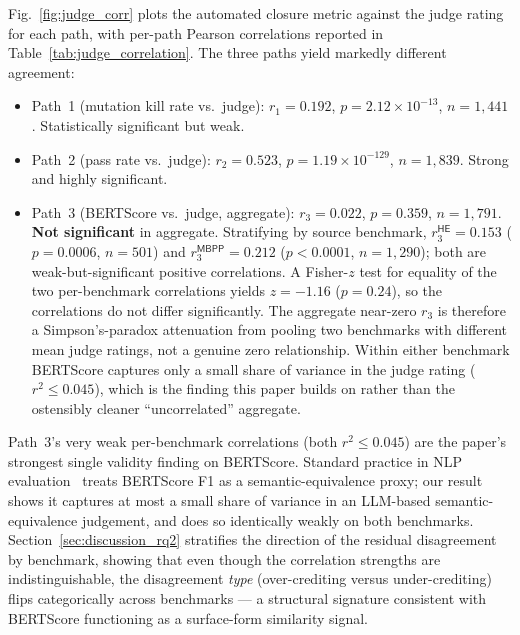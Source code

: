 \medskip



Fig.~\ref{fig:judge_corr} plots the automated closure metric against the judge rating for each path, with per-path Pearson correlations reported in Table~\ref{tab:judge_correlation}. The three paths yield markedly different agreement:

\begin{itemize}
  \item Path~1 (mutation kill rate vs.\ judge): $r_1 = 0.192$, $p = 2.12 \times 10^{-13}$, $n = 1{,}441$. Statistically significant but weak.
  \item Path~2 (pass rate vs.\ judge): $r_2 = 0.523$, $p = 1.19 \times 10^{-129}$, $n = 1{,}839$. Strong and highly significant.
  \item Path~3 (BERTScore vs.\ judge, aggregate): $r_3 = 0.022$, $p = 0.359$, $n = 1{,}791$. \textbf{Not significant} in aggregate. Stratifying by source benchmark, $r_3^{\textsf{HE}} = 0.153$ ($p = 0.0006$, $n = 501$) and $r_3^{\textsf{MBPP}} = 0.212$ ($p < 0.0001$, $n = 1{,}290$); both are weak-but-significant positive correlations. A Fisher-$z$ test for equality of the two per-benchmark correlations yields $z = -1.16$ ($p = 0.24$), so the correlations do not differ significantly. The aggregate near-zero $r_3$ is therefore a Simpson's-paradox attenuation from pooling two benchmarks with different mean judge ratings, not a genuine zero relationship. Within either benchmark BERTScore captures only a small share of variance in the judge rating ($r^2 \leq 0.045$), which is the finding this paper builds on rather than the ostensibly cleaner ``uncorrelated'' aggregate.
\end{itemize}

Path~3's very weak per-benchmark correlations (both $r^2 \leq 0.045$) are the paper's strongest single validity finding on BERTScore. Standard practice in NLP evaluation~\citep{Zhang2020BERTScore} treats BERTScore F1 as a semantic-equivalence proxy; our result shows it captures at most a small share of variance in an LLM-based semantic-equivalence judgement, and does so identically weakly on both benchmarks. Section~\ref{sec:discussion_rq2} stratifies the direction of the residual disagreement by benchmark, showing that even though the correlation strengths are indistinguishable, the disagreement \emph{type} (over-crediting versus under-crediting) flips categorically across benchmarks --- a structural signature consistent with BERTScore functioning as a surface-form similarity signal.

